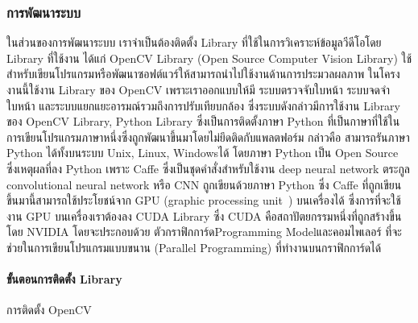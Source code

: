\subsubsection{การพัฒนาระบบ}
ในส่วนของการพัฒนาระบบ เราจำเป็นต้องติดตั้ง Library ที่ใช้ในการวิเคราะห์ข้อมูลวีดีโอโดย Library ที่ใช้งาน ได้แก่ OpenCV Library (Open Source Computer Vision Library) ใช้สำหรับเขียนโปรแกรมหรือพัฒนาซอฟต์แวร์ให้สามารถนำไปใช้งานด้านการประมวลผลภาพ ในโครงงานนี้ใช้งาน Library ของ OpenCV เพราะเราออกแบบให้มี ระบบตรวจจับใบหน้า ระบบจดจำใบหน้า และระบบแยกแยะอารมณ์รวมถึงการปรับเทียบกล้อง ซึ่งระบบดังกล่าวมีการใช้งาน Library ของ OpenCV Library, Python Library ซึ่งเป็นการติดตั้งภาษา Python ที่เป็นกาษาที่ใช้ในการเขียนโปรแกรมภาษาหนึ่งซึ่งถูกพัฒนาขึ้นมาโดยไม่ยึดติดกับแพลตฟอร์ม กล่าวคือ สามารถรันภาษา Python ได้ทั้งบนระบบ Unix, Linux, Windowsได้ โดยภาษา Python เป็น Open Source ซึ่งเหตุผลที่ลง Python เพราะ Caffe ซึ่งเป็นชุดคำสั่งสำหรับใช้งาน deep neural network ตระกูล convolutional neural network หรือ CNN ถูกเขียนด้วยภาษา Python ซึ่ง Caffe ที่ถูกเขียนขึ้นมานี้สามารถใช้ประโยชน์จาก GPU (graphic processing unit ) บนเครื่องได้ ซึ่งการที่จะใช้งาน GPU บนเครื่องเราต้องลง CUDA Library ซึ่ง CUDA คือสถาปัตยกรรมหนึ่งที่ถูกสร้างขึ้นโดย NVIDIA โดยจะประกอบด้วย ตัวกราฟิกการ์ดProgramming Modelและคอมไพเลอร์ ที่จะช่วยในการเขียนโปรแกรมแบบขนาน (Parallel Programming) ที่ทำงานบนกราฟิกการ์ดได้

\paragraph{\textbf{ขั้นตอนการติดตั้ง Library}}
การติดตั้ง OpenCV

